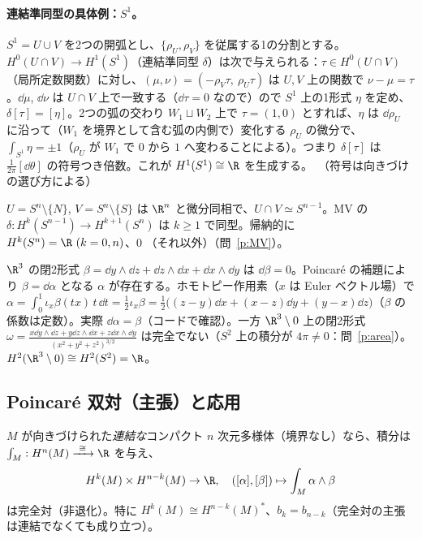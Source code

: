 \paragraph{連結準同型の具体例：$S^1$。}$S^1=U\cup V$ を2つの開弧とし、$\{\rho_U,\rho_V\}$ を従属する1の分割とする。$H^0(U\cap V)\to H^1(S^1)$（連結準同型 $\delta$）は次で与えられる：$\tau\in H^0(U\cap V)$（局所定数関数）に対し、$(\mu,\nu)=(-\rho_V\tau,\ \rho_U\tau)$ は $U,V$ 上の関数で $\nu-\mu=\tau$。$\dd\mu$, $\dd\nu$ は $U\cap V$ 上で一致する（$\dd\tau=0$ なので）ので $S^1$ 上の1形式 $\eta$ を定め、$\delta[\tau]=[\eta]$。2つの弧の交わり $W_1\sqcup W_2$ 上で $\tau=(1,0)$ とすれば、$\eta$ は $\dd\rho_U$ に沿って（$W_1$ を境界として含む弧の内側で）変化する $\rho_U$ の微分で、$\int_{S^1}\eta=\pm1$（$\rho_U$ が $W_1$ で $0$ から $1$ へ変わることによる）。つまり $\delta[\tau]$ は $\frac1{2\pi}[\dd\theta]$ の符号つき倍数。これが $H^1(S^1)\cong\R$ を生成する。\tQ\ （符号は向きづけの選び方による）

\begin{ex}[$S^n$]
$U=S^n\setminus\{N\}$, $V=S^n\setminus\{S\}$ は $\R^n$ と微分同相で、$U\cap V\simeq S^{n-1}$。MV の $\delta:H^{k}(S^{n-1})\to H^{k+1}(S^n)$ は $k\ge1$ で同型。帰納的に $H^k(S^n)=\R\ (k=0,n)$、$0$ （それ以外）（問~\ref{p:MV}）。
\end{ex}


\begin{ex}[2形式の原始形式]
$\R^3$ の閉2形式 $\beta=\dd y\wedge\dd z+\dd z\wedge\dd x+\dd x\wedge\dd y$ は $\dd\beta=0$。Poincar\'e の補題により $\beta=\dd\alpha$ となる $\alpha$ が存在する。ホモトピー作用素（$x$ は Euler ベクトル場）で $\alpha=\int_0^1\iota_{x}\beta(tx)\,t\,\dd t=\frac12\iota_x\beta=\frac12\bigl((z-y)\dd x+(x-z)\dd y+(y-x)\dd z\bigr)$（$\beta$ の係数は定数）。実際 $\dd\alpha=\beta$（コードで確認）。一方 $\R^3\setminus0$ 上の閉2形式 $\omega=\frac{x\dd y\wedge\dd z+y\dd z\wedge\dd x+z\dd x\wedge\dd y}{(x^2+y^2+z^2)^{3/2}}$ は完全でない（$S^2$ 上の積分が $4\pi\ne0$：問~\ref{p:area}）。$H^2(\R^3\setminus0)\cong H^2(S^2)=\R$。
\end{ex}

\subsection{Poincar\'e 双対（主張）と応用}
\begin{thm}[Poincar\'e 双対]\label{thm:PD}\tC
$M$ が向きづけられた\emph{連結な}コンパクト $n$ 次元多様体（境界なし）なら、積分は $\int_M:H^n(M)\xrightarrow{\ \cong\ }\R$ を与え、
\[
H^k(M)\times H^{n-k}(M)\to\R,\quad([\alpha],[\beta])\mapsto\int_M\alpha\wedge\beta
\]
は完全対（非退化）。特に $H^k(M)\cong H^{n-k}(M)^*$、$b_k=b_{n-k}$（完全対の主張は連結でなくても成り立つ）。
\end{thm}

